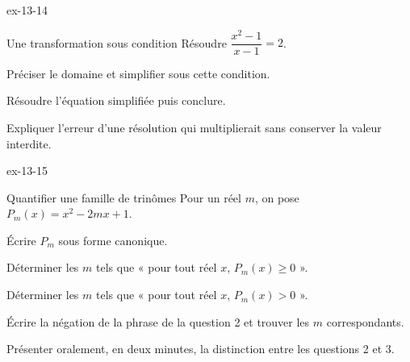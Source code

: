 \begin{blocLivre}{ex-13-14}
\begin{exercice}[3]{Une transformation sous condition}
Résoudre $\dfrac{x^2-1}{x-1}=2$.\begin{questions}
\item Préciser le domaine et simplifier sous cette condition.
\item Résoudre l’équation simplifiée puis conclure.
\item Expliquer l’erreur d’une résolution qui multiplierait sans conserver la valeur interdite.
\end{questions}
\end{exercice}
\end{blocLivre}
\begin{blocLivre}{ex-13-15}
\begin{exercice}[3]{Quantifier une famille de trinômes}
Pour un réel $m$, on pose $P_m(x)=x^2-2mx+1$.\begin{questions}
\item Écrire $P_m$ sous forme canonique.
\item Déterminer les $m$ tels que « pour tout réel $x$, $P_m(x)\geq0$ ».
\item Déterminer les $m$ tels que « pour tout réel $x$, $P_m(x)>0$ ».
\item Écrire la négation de la phrase de la question 2 et trouver les $m$ correspondants.
\item Présenter oralement, en deux minutes, la distinction entre les questions 2 et 3.
\end{questions}
\end{exercice}
\end{blocLivre}
